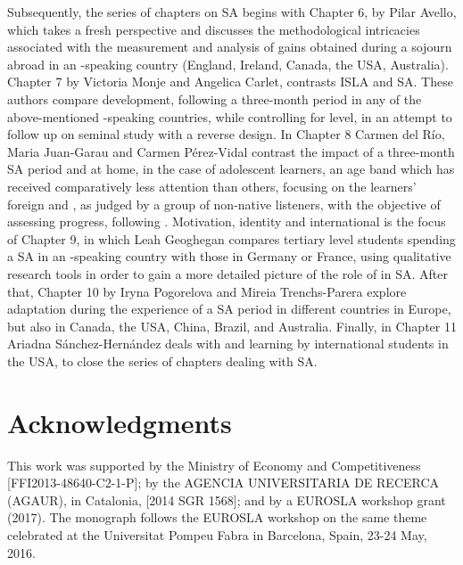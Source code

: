\documentclass[output=paper]{langsci/langscibook}
\begin{document}
\largerpage
Subsequently, the series of chapters on SA begins with Chapter 6, by Pilar Avello, which takes a fresh perspective and discusses the methodological intricacies associated with the measurement and analysis of  gains obtained during a sojourn abroad in an -speaking country (England, Ireland, Canada, the USA, Australia). Chapter 7 by Victoria Monje and Angelica Carlet, contrasts ISLA and SA. These authors compare   development, following a three-month period in any of the above-mentioned -speaking countries, while controlling for  level, in an attempt to follow up on  seminal study with a reverse design. In Chapter 8 Carmen del Río, Maria Juan-Garau and Carmen Pérez-Vidal contrast the impact of a three-month SA period and  at home, in the case of adolescent  learners, an age band which has received comparatively less attention than others, focusing on the learners’ foreign  and , as judged by a group of non-native listeners, with the objective of assessing progress, following \citet{TrofimovichIsaacs2012}. {Motivation, identity and international  is the focus of Chapter 9, in which Leah Geoghegan compares tertiary level students spending a SA in an -speaking country with those in Germany or France, using qualitative research tools in order to gain a more detailed picture of the role of  in SA. After that, Chapter 10 by Iryna Pogorelova and Mireia Trenchs-Parera explore}  adaptation during the experience of a SA period in different countries in Europe, but also in Canada, the USA, China, Brazil, and Australia. Finally, in Chapter 11 Ariadna Sánchez-Hernández deals with  and  learning by international students in the USA, to close the series of chapters dealing with SA. 


\section*{Acknowledgments}
This work was supported
by the Ministry of Economy and Competitiveness [FFI{\linebreak}2013-48640-C2-1-P];
by the AGENCIA UNIVERSITARIA DE RECERCA (AGAUR), in Catalonia, [2014 SGR 1568]; 
and by a EUROSLA workshop grant (2017).   The monograph follows the EUROSLA workshop on the same theme celebrated at the Universitat Pompeu Fabra in Barcelona, Spain, 23-24 May, 2016.
 
 
\sloppy
\printbibliography[heading=subbibliography,notkeyword=this] 
\end{document}
